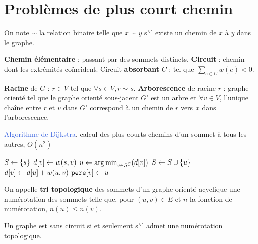 \documentclass[a4paper,10pt,twocolumn]{article}
\begin{document}
\section{Problèmes de plus court chemin}

	\begin{note}
	On note $\sim$ la relation binaire telle que $x \sim y$ s'il existe un chemin de $x$ à $y$ dans le graphe.
	\end{note}

	\begin{defn}
	\textbf{Chemin élémentaire} : passant par des sommets distincts.
	\textbf{Circuit} : chemin dont les extrémités coïncident.
	Circuit \textbf{absorbant} $C$ : tel que $\sum_{e \in C} w(e) < 0$.
	\end{defn}

	\begin{defn}
	\textbf{Racine} de $G$ : $r \in V$ tel que $\forall s \in V, r \sim s$.
	\textbf{Arborescence} de racine $r$ : graphe orienté tel que le graphe orienté sous-jacent $G'$ est un arbre et $\forall v \in V$, l'unique chaîne entre $r$ et $v$ dans $G'$ correspond à un chemin de $r$ vers $x$ dans l’arborescence.
	\end{defn}


	\begin{algorithm}
	\caption{\textcolor{RoyalBlue}{Algorithme de Dijkstra}, calcul des plus courts chemins d'un sommet à tous les autres, $O(n^2)$}
	$S \leftarrow \{ s \}$\;
	{
		$d[v] \leftarrow w(s,v)$
	}
	{
		$u \leftarrow \operatorname{arg\, min}_{v \in {S}^{\mathcal{C}}}(d[v])$\;
		$S \leftarrow S \cup \{ u \}$\;
		{
			{
				$d[v] \leftarrow d[u] + w(u,v)$ \;
				$\texttt{pere}[v] \leftarrow u$ \;
			}
		}
	}
	\end{algorithm}

	\begin{defn}
	On appelle \textbf{tri topologique} des sommets d'un graphe orienté acyclique une numérotation des sommets telle que, pour $(u,v) \in E$ et $n$ la fonction de numérotation, $n(u) \leq n(v)$.
	\end{defn}

	\begin{pop}
	Un graphe est sans circuit si et seulement s'il admet une numérotation topologique.
	\end{pop}
\end{document}
